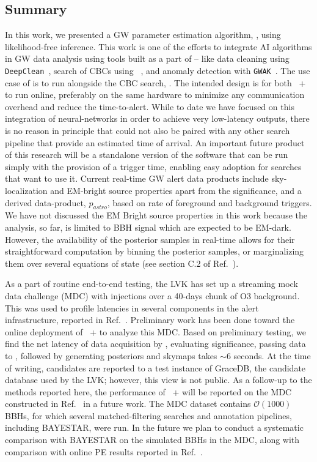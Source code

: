 \begin{refsection}
\section{Summary}\label{amp_meth_sec:conclusion}
In this work, we presented a GW parameter estimation algorithm, {\amplfi}, using likelihood-free inference.
This work is one of the efforts to integrate AI algorithms in GW data analysis using tools built as a part of {\mlgw} -- like data cleaning using {\tt{DeepClean}}~\cite{Saleem_2024}, search of CBCs using {\aframe}~\cite{aframe-methods}, and anomaly detection with {\tt GWAK}~\cite{Raikman:2023ktu}.
The use case of {\amplfi} is to run alongside the CBC search, {\aframe}.
The intended design is for both {\aframe~+~\amplfi} to run online, preferably on the same hardware to minimize any communication overhead and reduce the time-to-alert. 
While to date we have focused on this integration of neural-networks in order to achieve very low-latency outputs, there is no reason in principle that {\amplfi} could not also be paired with any other search pipeline that provide an estimated time of arrival. 
An important future product of this research will be a standalone version of the software that can be run simply with the provision of a trigger time, enabling easy adoption for searches that want to use it. 
Current real-time GW alert data products include sky-localization and EM-bright source properties apart from the significance, and a derived data-product, $p_{astro}$, based on rate of foreground and background triggers. 
We have not discussed the EM Bright source properties in this work because the analysis, so far, is limited to BBH signal which are expected to be EM-dark. 
However, the availability of the posterior samples in real-time allows for their straightforward computation by binning the posterior samples, or marginalizing them over several equations of state (see section C.2 of Ref.~\cite{Chaudhary_2024}).

As a part of routine end-to-end testing, the LVK has set up a streaming mock data challenge (MDC) with injections over a 40-days chunk of O3 background. 
This was used to profile latencies in several components in the alert infrastructure, reported in Ref.~\cite{Chaudhary_2024}. 
Preliminary work has been done toward the online deployment of {\aframe~+ \amplfi} to analyze this MDC.
Based on preliminary testing, we find the net latency of data acquisition by \aframe, evaluating significance, passing data to \amplfi, followed by generating posteriors and skymaps takes $\sim 6$ seconds. 
At the time of writing, candidates are reported to a test instance of GraceDB, the candidate database used by the LVK; however, this view is not public. 
As a follow-up to the methods reported here, the performance of {\aframe~+ \amplfi} will be reported on the MDC constructed in Ref.~\cite{Chaudhary_2024} in a future work. 
The MDC dataset contains $\mathcal{O}(1000)$ BBHs, for which several matched-filtering searches and annotation pipelines, including BAYESTAR, were run. 
In the future we plan to conduct a systematic comparison with BAYESTAR on the simulated BBHs in the MDC, along with comparison with online PE results reported in Ref.~\cite{Chaudhary_2024}.


\end{refsection}
